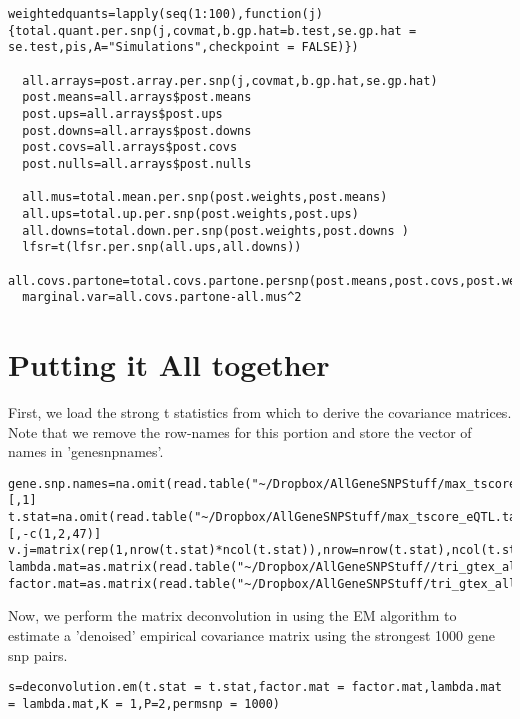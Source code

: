 \documentclass[10pt]{article}
\begin{document}
\begin{verbatim}
weightedquants=lapply(seq(1:100),function(j){total.quant.per.snp(j,covmat,b.gp.hat=b.test,se.gp.hat = se.test,pis,A="Simulations",checkpoint = FALSE)})
                          
  all.arrays=post.array.per.snp(j,covmat,b.gp.hat,se.gp.hat)
  post.means=all.arrays$post.means
  post.ups=all.arrays$post.ups
  post.downs=all.arrays$post.downs
  post.covs=all.arrays$post.covs
  post.nulls=all.arrays$post.nulls
  
  all.mus=total.mean.per.snp(post.weights,post.means)
  all.ups=total.up.per.snp(post.weights,post.ups)
  all.downs=total.down.per.snp(post.weights,post.downs )
  lfsr=t(lfsr.per.snp(all.ups,all.downs))
  all.covs.partone=total.covs.partone.persnp(post.means,post.covs,post.weights)
  marginal.var=all.covs.partone-all.mus^2

\end{verbatim}



\section{Putting it All together}

First, we load the strong t statistics from which to derive the covariance matrices. Note that we remove the row-names for this portion and store the vector of names in 'genesnpnames'.

\begin{verbatim}
gene.snp.names=na.omit(read.table("~/Dropbox/AllGeneSNPStuff/max_tscore_eQTL.table.txt"))[,1]
t.stat=na.omit(read.table("~/Dropbox/AllGeneSNPStuff/max_tscore_eQTL.table.txt"))[,-c(1,2,47)]
v.j=matrix(rep(1,nrow(t.stat)*ncol(t.stat)),nrow=nrow(t.stat),ncol(t.stat))
lambda.mat=as.matrix(read.table("~/Dropbox/AllGeneSNPStuff//tri_gtex_allstrongt_lambda.out"))
factor.mat=as.matrix(read.table("~/Dropbox/AllGeneSNPStuff/tri_gtex_allstrongt_F.out"))
\end{verbatim}

Now, we perform the matrix deconvolution in using the EM algorithm to estimate a 'denoised' empirical covariance matrix using the strongest 1000 gene snp pairs.

\begin{verbatim}
s=deconvolution.em(t.stat = t.stat,factor.mat = factor.mat,lambda.mat = lambda.mat,K = 1,P=2,permsnp = 1000)
\end{verbatim}
\end{document}
